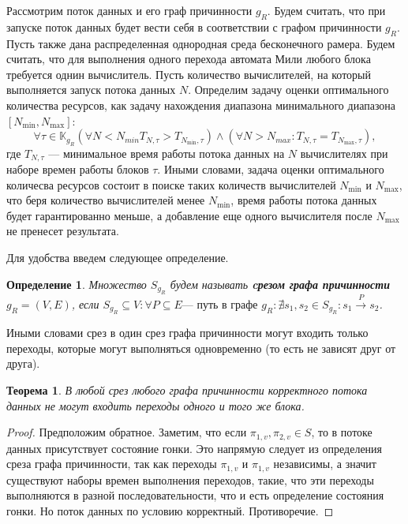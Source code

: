 \documentclass[10pt,a4paper]{article}
\newtheorem{defen}{Определение}
\newtheorem{theorem}{Теорема}
\begin{document}
  Рассмотрим поток данных и его граф причинности $g_R$. Будем считать, что при запуске поток данных будет вести себя в соответствии с графом причинности $g_R$.
  Пусть также дана распределенная однородная среда бесконечного рамера. Будем считать, что для выполнения одного перехода автомата Мили любого блока требуется однин вычислитель.
  Пусть количество вычислителей, на который выполняется запуск потока данных $N$. Определим задачу оценки оптимального количества ресурсов, как задачу
  нахождения диапазона минимального диапазона $[N_{\min}, N_{\max}]$:
  $$\forall \tau \in \mathbb{K}_{g_R} (\forall N < N_{min} T_{N, \tau} > T_{N_{\min}, \tau}) \wedge (\forall N > N_{max}: T_{N, \tau} = T_{N_{\max}, \tau}),$$
  где $T_{N, \tau}$ --- минимальное время работы потока данных на $N$ вычислителях при наборе времен работы блоков $\tau$.
  Иными словами, задача оценки оптимального количесва ресурсов состоит в поиске таких количеств вычислителей $N_{\min}$ и $N_{\max}$, что
  беря количество вычислителей менее $N_{\min}$, время работы потока данных будет гарантированно меньше, а добавление еще одного вычислителя после $N_{\max}$ не пренесет результата.
  
  Для удобства введем следующее определение.
  \begin{defen}
    Множество $S_{g_R}$ будем называть \textbf{cрезом графа причинности} $g_R = (V, E)$, если
    $S_{g_R} \subseteq V: \forall P \subseteq E \text{--- путь в графе } g_R: \nexists s_1, s_2 \in S_{g_R}: s_1 \xrightarrow{P} s_2$.
  \end{defen}
  Иными словами срез в один срез графа причинности могут входить только переходы, которые могут выполняться одновременно (то есть не зависят друг от друга).
  
  \begin{theorem}
    В любой срез любого графа причинности корректного потока данных не могут входить переходы одного и того же блока.
  \end{theorem}
  \begin{proof}
    Предположим обратное. Заметим, что если $\pi_{1, v}, \pi_{2, v} \in S$, то в потоке данных присутствует состояние гонки. Это напрямую следует из определения
    среза графа причинности, так как переходы $\pi_{1, v}$ и $\pi_{1, v}$ независимы, а значит существуют наборы времен выполнения переходов, такие, что эти
    переходы выполняются в разной последовательности, что и есть определение состояния гонки. Но поток данных по условию корректный. Противоречие.
  \end{proof}
  
\end{document}

